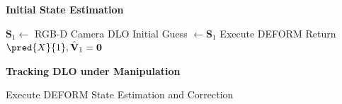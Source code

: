 \begin{algorithm}[t]
\caption{Tracking DLO with Modeling} 
\label{code:DLO tracking}
\textbf{Initial State Estimation}
\begin{algorithmic}[1]
\Require $\textbf{S}_1 \leftarrow $ RGB-D Camera
\State DLO Initial Guess $\leftarrow \textbf{S}_1$
\State Execute DEFORM 
\EndWhile
\State Return $\pred{X}{1}, \hat{\textbf{V}}_1 = \textbf{0}$
\end{algorithmic}
\textbf{Tracking DLO under Manipulation}
\begin{algorithmic}[1]
\State Execute DEFORM 
\EndWhile
\State State Estimation and Correction
\EndWhile
\end{algorithmic}
\end{algorithm}





